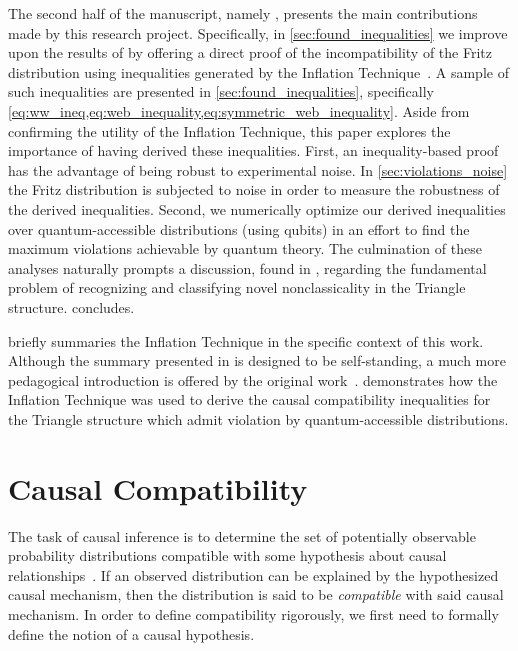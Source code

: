 \documentclass[aps, 10pt, english, twoside, pra, nofootinbib, tightenlines, longbibliography, superscriptaddress]{revtex4-1}
\begin{document}
    The second half of the manuscript, namely , presents the main contributions made by this research project. Specifically, in \cref{sec:found_inequalities} we improve upon the results of \citet{Fritz_2012} by offering a direct proof of the incompatibility of the Fritz distribution using inequalities generated by the Inflation Technique~\cite{Inflation}. A sample of such inequalities are presented in \cref{sec:found_inequalities}, specifically \cref{eq:ww_ineq,eq:web_inequality,eq:symmetric_web_inequality}. Aside from confirming the utility of the Inflation Technique, this paper explores the importance of having derived these inequalities. First, an inequality-based proof has the advantage of being robust to experimental noise. In \cref{sec:violations_noise} the Fritz distribution is subjected to noise in order to measure the robustness of the derived inequalities. Second, we numerically optimize our derived inequalities over quantum-accessible distributions (using qubits) in an effort to find the maximum violations achievable by quantum theory. The culmination of these analyses naturally prompts a discussion, found in , regarding the fundamental problem of recognizing and classifying novel nonclassicality in the Triangle structure.  concludes.

     briefly summaries the Inflation Technique in the specific context of this work. Although the summary presented in  is designed to be self-standing, a much more pedagogical introduction is offered by the original work~\cite{Inflation}.  demonstrates how the Inflation Technique was used to derive the causal compatibility inequalities for the Triangle structure which admit violation by quantum-accessible distributions.

    \section{Causal Compatibility}
    \label{sec:causal_compatibility}
    The task of causal inference is to determine the set of potentially observable probability distributions compatible with some hypothesis about causal relationships~\cite{Pearl_2009}. If an observed distribution can be explained by the hypothesized causal mechanism, then the distribution is said to be \textit{compatible} with said causal mechanism. In order to define compatibility rigorously, we first need to formally define the notion of a causal hypothesis.
\end{document}
